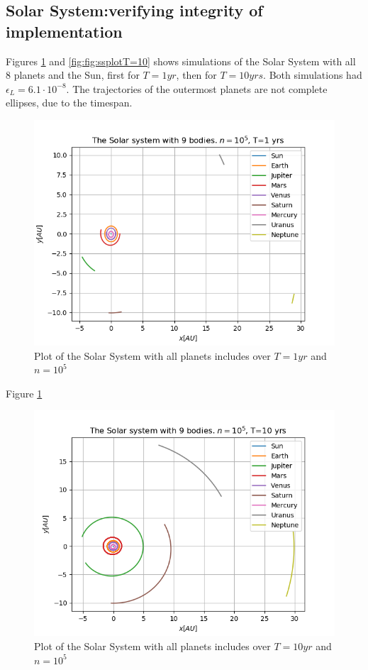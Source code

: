 \documentclass[%
oneside,                 %
final,                   %
10pt]{article}
\begin{document}
\subsection{Solar System:verifying integrity of implementation}
Figures \ref{fig:ssplotT=1} and \ref{fig:fig:ssplotT=10} shows simulations of the Solar System with all 8 planets and the Sun, first for $T=1yr$, then for $T=10yrs$. Both simulations had $\epsilon_L=6.1 \cdot 10^{-8}$. The trajectories of the outermost planets are not complete ellipses, due to the timespan.

\begin{figure}[!htb]
        \centering 
         \includegraphics[scale=.6]{../Results/SolarSyst9BodiesNj5T1.png} 
        \caption{Plot of the Solar System with all planets includes over $T=1 yr$ and $n=10^5$}
        \label{fig:ssplotT=1}   
\end{figure}  


Figure \ref{fig:ssplotT=1}
\begin{figure}[!htb]
        \centering 
         \includegraphics[scale=.6]{../Results/SolarSyst9BodiesNj5T10.png} 
        \caption{Plot of the Solar System with all planets includes over $T=10 yr$ and $n=10^5$}
        \label{fig:ssplotT=10}   
\end{figure}  
\end{document}
